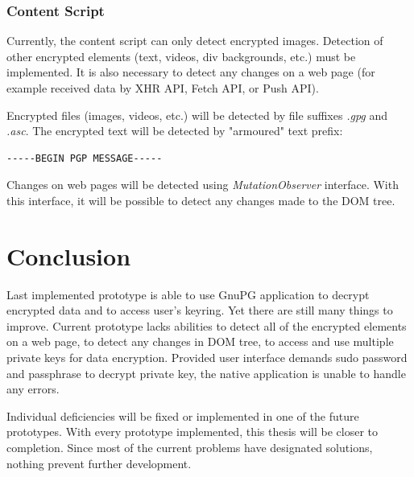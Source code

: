 \subsection{Content Script}
Currently, the content script can only detect encrypted images. Detection of other encrypted elements (text, videos, div backgrounds, etc.) must be implemented. It is also necessary to detect any changes on a web page (for example received data by XHR API, Fetch API, or Push
API).

Encrypted files (images, videos, etc.) will be detected by file suffixes \textit{.gpg} and \textit{.asc}. The encrypted text will be detected by "armoured" text prefix:
\begin{verbatim}
-----BEGIN PGP MESSAGE-----
\end{verbatim}

Changes on web pages will be detected using \textit{MutationObserver} interface. With this interface, it will be possible to detect any changes made to the DOM tree.

\chapter{Conclusion} 
Last implemented prototype is able to use GnuPG application to decrypt encrypted data and to access user's keyring. Yet there are still many things to improve. Current prototype lacks abilities to detect all of the encrypted elements on a web page, to detect any changes in DOM tree, to access and use multiple private keys for data encryption. Provided user interface demands sudo password and passphrase to decrypt private key, the native application is unable to handle any errors.

Individual deficiencies will be fixed or implemented in one of the future prototypes. With every prototype implemented, this thesis will be closer to completion. Since most of the current problems have designated solutions, nothing prevent further development.